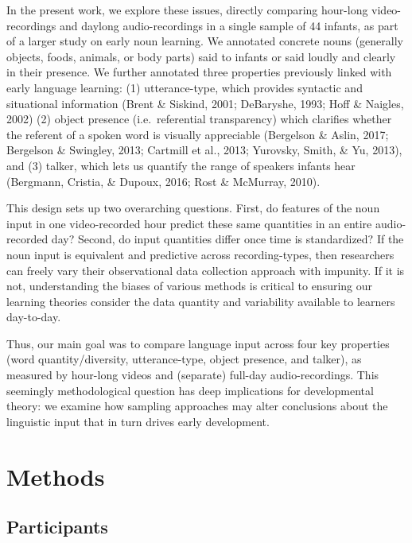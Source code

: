 \documentclass[man]{apa6}
\theoremstyle{definition}
\theoremstyle{definition}
\theoremstyle{definition}
\theoremstyle{remark}
\begin{document}
In the present work, we explore these issues, directly comparing
hour-long video-recordings and daylong audio-recordings in a single
sample of 44 infants, as part of a larger study on early noun learning.
We annotated concrete nouns (generally objects, foods, animals, or body
parts) said to infants or said loudly and clearly in their presence. We
further annotated three properties previously linked with early language
learning: (1) utterance-type, which provides syntactic and situational
information (Brent \& Siskind, 2001; DeBaryshe, 1993; Hoff \& Naigles,
2002) (2) object presence (i.e.~referential transparency) which
clarifies whether the referent of a spoken word is visually appreciable
(Bergelson \& Aslin, 2017; Bergelson \& Swingley, 2013; Cartmill et al.,
2013; Yurovsky, Smith, \& Yu, 2013), and (3) talker, which lets us
quantify the range of speakers infants hear (Bergmann, Cristia, \&
Dupoux, 2016; Rost \& McMurray, 2010).

This design sets up two overarching questions. First, do features of the
noun input in one video-recorded hour predict these same quantities in
an entire audio-recorded day? Second, do input quantities differ once
time is standardized? If the noun input is equivalent and predictive
across recording-types, then researchers can freely vary their
observational data collection approach with impunity. If it is not,
understanding the biases of various methods is critical to ensuring our
learning theories consider the data quantity and variability available
to learners day-to-day.

Thus, our main goal was to compare language input across four key
properties (word quantity/diversity, utterance-type, object presence,
and talker), as measured by hour-long videos and (separate) full-day
audio-recordings. This seemingly methodological question has deep
implications for developmental theory: we examine how sampling
approaches may alter conclusions about the linguistic input that in turn
drives early development.

\section{Methods}\label{methods}

\subsection{Participants}\label{participants}
\end{document}
